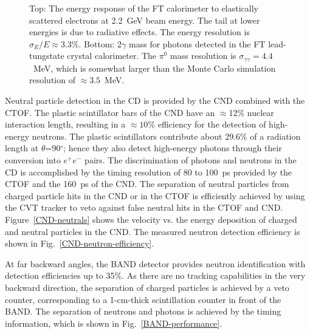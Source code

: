 \documentclass[final,3p,twocolumn]{elsarticle}
\begin{document}
\begin{figure}[t!]
\caption{Top: The energy response of the FT calorimeter to elastically scattered electrons at 2.2~GeV beam energy.
  The tail at lower energies is due to radiative effects. The energy resolution is $\sigma_E / E \approx 3.3\%$. Bottom:
  2$\gamma$ mass for photons detected in the FT lead-tungstate crystal calorimeter. The $\pi^0$ mass resolution is
  $\sigma_{\gamma\gamma} = 4.4$~MeV, which is somewhat larger than the Monte Carlo simulation resolution of
  $\approx 3.5$~MeV.}
\label{FT-en-gg}
\end{figure}

Neutral particle detection in the CD is provided by the CND combined with the CTOF. The plastic scintillator bars
of the CND have an $\approx$12\% nuclear interaction length, resulting in a $\approx 10\%$ efficiency for the
detection of high-energy neutrons. The plastic scintillators contribute about 29.6\% of a radiation length at
$\theta$=90$^\circ$; hence they also detect high-energy photons through their conversion into $e^+e^-$ pairs. The
discrimination of photons and neutrons in the CD is accomplished by the timing resolution of 80 to 100~ps provided by
the CTOF and the 160~ps of the CND. The separation of neutral particles from charged particle hits in the CND or in
the CTOF is efficiently achieved by using the CVT tracker to veto against false neutral hits in the CTOF and CND.
Figure~\ref{CND-neutrals} shows the velocity vs. the energy deposition of charged and neutral particles in the
CND. The measured neutron detection efficiency is shown in Fig.~\ref{CND-neutron-efficiency}.

At far backward angles, the BAND detector provides neutron identification with detection efficiencies up to 35\%. As
there are no tracking capabilities in the very backward direction, the separation of charged particles is achieved by a
veto counter, corresponding to a 1-cm-thick scintillation counter in front of the BAND. The separation of neutrons and
photons is achieved by the timing information, which is shown in Fig.~\ref{BAND-performance}.   
\end{document}
